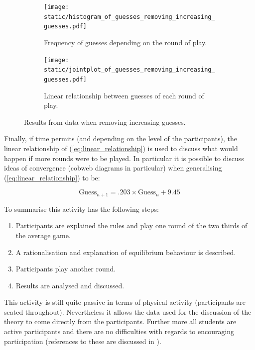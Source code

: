 \documentclass[12pt, a4paper]{article}
\begin{document}
\begin{figure}[!hbtp]
    \begin{subfigure}{.6\textwidth}
        \centering
        \texttt{[image: static/histogram\_of\_guesses\_removing\_increasing\_guesses.pdf]}
        \caption{Frequency of guesses depending on the round of play.}
        \label{fig:histogram_of_guess}
    \end{subfigure}
    \begin{subfigure}{.4\textwidth}
        \centering
        \texttt{[image: static/jointplot\_of\_guesses\_removing\_increasing\_guesses.pdf]}
        \caption{Linear relationship between guesses of each round of play.}
        \label{fig:jointplot_of_guess}
    \end{subfigure}
    \caption{Results from data when removing increasing guesses.}
    \label{fig:results_with_decreasing_guess}
\end{figure}

Finally, if time permits (and depending on the level of the participants), the
linear relationship of (\ref{eq:linear_relationship}) is used to discuss what
would happen if more rounds were to be played. In particular it is possible to
discuss ideas of convergence (cobweb diagrams in particular) when generalising
(\ref{eq:linear_relationship}) to be:

\begin{equation}
    \text{Guess}_{n+1} = .203\times\text{Guess}_n + 9.45
    \label{eq:extrapolated_linear_relationship}
\end{equation}

To summarise this activity has the following steps:

\begin{enumerate}
    \item Participants are explained the rules and play one round of the two
        thirds of the average game.
    \item A rationalisation and explanation of equilibrium behaviour is
        described.
    \item Participants play another round.
    \item Results are analysed and discussed.
\end{enumerate}

This activity is still quite passive in terms of physical activity (participants are
seated throughout). Nevertheless it allows the data used for the discussion of
the theory to come directly from the participants. Further more all students
are active participants and there are no difficulties with regards to
encouraging participation (references to these are discussed in \cite{Rocca2010}).
\end{document}
